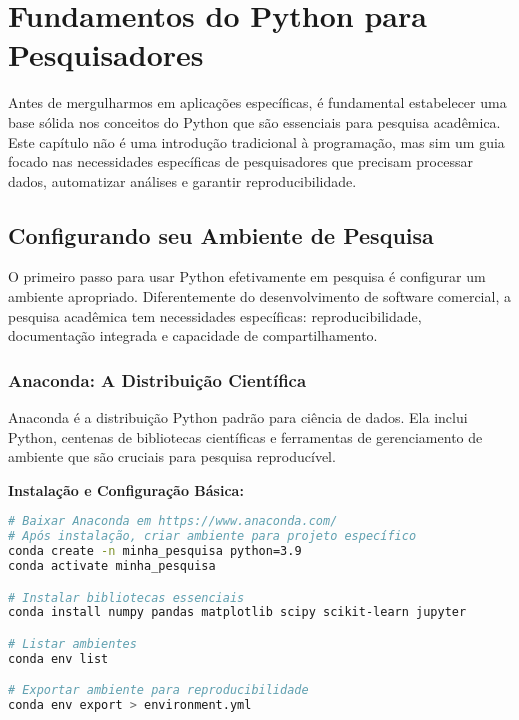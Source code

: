 

\chapter{Fundamentos do Python para Pesquisadores}

Antes de mergulharmos em aplicações específicas, é fundamental estabelecer uma base sólida nos conceitos do Python que são essenciais para pesquisa acadêmica. Este capítulo não é uma introdução tradicional à programação, mas sim um guia focado nas necessidades específicas de pesquisadores que precisam processar dados, automatizar análises e garantir reproducibilidade.

\section{Configurando seu Ambiente de Pesquisa}

O primeiro passo para usar Python efetivamente em pesquisa é configurar um ambiente apropriado. Diferentemente do desenvolvimento de software comercial, a pesquisa acadêmica tem necessidades específicas: reproducibilidade, documentação integrada e capacidade de compartilhamento.

\subsection{Anaconda: A Distribuição Científica}

Anaconda é a distribuição Python padrão para ciência de dados. Ela inclui Python, centenas de bibliotecas científicas e ferramentas de gerenciamento de ambiente que são cruciais para pesquisa reproducível.

\begin{examplebox}
\textbf{Instalação e Configuração Básica:}

\begin{lstlisting}[language=bash,breaklines=true,postbreak=\mbox{\textcolor{red}{$\hookrightarrow$}\space}]
# Baixar Anaconda em https://www.anaconda.com/
# Após instalação, criar ambiente para projeto específico
conda create -n minha_pesquisa python=3.9
conda activate minha_pesquisa

# Instalar bibliotecas essenciais
conda install numpy pandas matplotlib scipy scikit-learn jupyter

# Listar ambientes
conda env list

# Exportar ambiente para reproducibilidade
conda env export > environment.yml
\end{lstlisting}
\end{examplebox}

